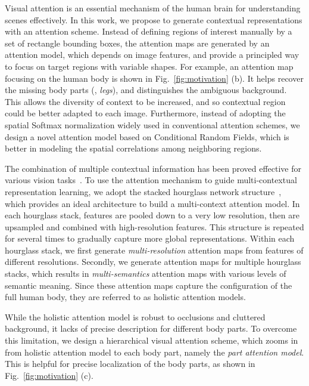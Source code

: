 \documentclass[10pt,twocolumn,letterpaper]{article}
\begin{document}
Visual attention is an essential mechanism of the human brain for understanding scenes effectively.
In this work, we propose to generate contextual representations with an attention scheme.
Instead of defining regions of interest manually by a set of rectangle bounding boxes, the attention maps are generated by an attention model, which depends on image features, and provide a principled way to focus on target regions with variable shapes. 
For example, an attention map focusing on the human body is shown in Fig.~\ref{fig:motivation} (b). 
It helps recover the missing body parts (\eg, \textit{legs}), and distinguishes the ambiguous background.
This allows the diversity of context to be increased, and so contextual region could be better adapted to each image. 
Furthermore, instead of adopting the spatial Softmax normalization widely used in conventional attention schemes, we design a novel attention model based on Conditional Random Fields, which is better in modeling the spatial correlations among neighboring regions.




The combination of multiple contextual information has been proved effective for various vision tasks~\cite{Zeng2013Multi,girshick2014deformable,ramakrishna2014pose,fan2015combining}.
To use the attention mechanism to guide multi-contextual representation learning, we adopt the stacked hourglass network structure~\cite{newell2016stacked}, which provides an ideal architecture to build a multi-context attention model. 
In each hourglass stack, features are pooled down to a very low resolution, then are upsampled and combined with high-resolution features. 
This structure is repeated for several times to gradually capture more global representations.
Within each hourglass stack, we first generate \textit{multi-resolution} attention maps from features of different resolutions.
Secondly, we generate attention maps for multiple hourglass stacks, which results in \textit{multi-semantics} attention maps with various levels of semantic meaning. 
Since these attention maps capture the configuration of the full human body, they are referred to as holistic attention models. 

While the holistic attention model is robust to occlusions and cluttered background, it lacks of precise description for different body parts. 
To overcome this limitation, we design a hierarchical visual attention scheme, which zooms in from holistic attention model to each body part, namely the \emph{part attention model}. 
This is helpful for precise localization of the body parts, as shown in Fig.~\ref{fig:motivation} (c).
\end{document}

